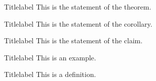 \documentclass{report}
\begin{document}
\begin{Theorem}{Title}{label}
    This is the statement of the theorem.
\end{Theorem}

\begin{corollary}{Title}{label}
    This is the statement of the corollary.
\end{corollary}

\begin{claim}{Title}{label}
    This is the statement of the claim.
\end{claim}

\begin{Example}{Title}{label}
    This is an example.
\end{Example}

\begin{Definition}{Title}{label}
    This is a definition.
\end{Definition}
\end{document}
